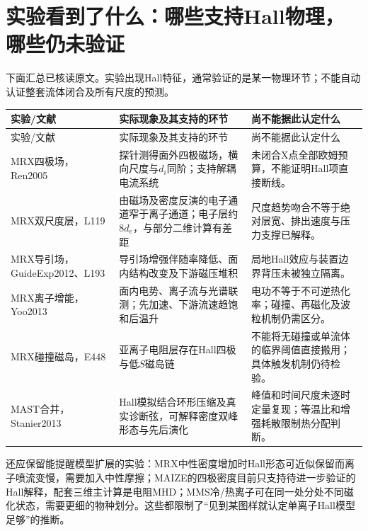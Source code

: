 \documentclass[UTF8,a4paper,11pt,openany,fontset=fandol]{ctexbook}
\begin{document}
\section{实验看到了什么：哪些支持Hall物理，哪些仍未验证}
下面汇总已核读原文。实验出现Hall特征，通常验证的是某一物理环节；不能自动认证整套流体闭合及所有尺度的预测。
\begin{longtable}{P{27mm}P{62mm}P{59mm}}
\toprule 实验/文献 & 实际现象及其支持的环节 & 尚不能据此认定什么\\\midrule\endfirsthead
\toprule 实验/文献 & 实际现象及其支持的环节 & 尚不能据此认定什么\\\midrule\endhead
MRX四极场，Ren2005 & 探针测得面外四极磁场，横向尺度与$d_i$同阶；支持解耦电流系统 & 未闭合X点全部欧姆预算，不能证明Hall项直接断线。\\
MRX双尺度层，L119 & 由磁场及密度反演的电子通道窄于离子通道；电子层约$8d_e$，与部分二维计算有差距 & 尺度趋势吻合不等于绝对层宽、排出速度与压力支撑已解释。\\
MRX导引场，GuideExp2012、L193 & 导引场增强伴随率降低、面内结构改变及下游磁压堆积 & 局地Hall效应与装置边界背压未被独立隔离。\\
MRX离子增能，Yoo2013 & 面内电势、离子流与光谱联测；先加速、下游流速趋饱和后温升 & 电功不等于不可逆热化率；碰撞、再磁化及波粒机制仍需区分。\\
MRX碰撞磁岛，E448 & 亚离子电阻层存在Hall四极与低$S$磁岛链 & 不能将无碰撞或单流体的临界阈值直接搬用；具体触发机制仍待检验。\\
MAST合并，Stanier2013 & Hall模拟结合环形压缩及真实诊断弦，可解释密度双峰形态与先后演化 & 峰值和时间尺度未逐时定量复现；等温比和增强耗散限制热分配判断。\\
\bottomrule
\end{longtable}
\citep{Ren2005,L119,GuideExp2012,L193,Yoo2013,E448,Stanier2013}

还应保留能提醒模型扩展的实验：MRX中性密度增加时Hall形态可近似保留而离子喷流变慢，需要加入中性摩擦；MAIZE的四极密度目前只支持待进一步验证的Hall解释，配套三维主计算是电阻MHD；MMS冷/热离子可在同一处分处不同磁化状态，需要更细的物种划分。这些都限制了“见到某图样就认定单离子Hall模型足够”的推断。\citep{L190,F703,L227}
\end{document}
